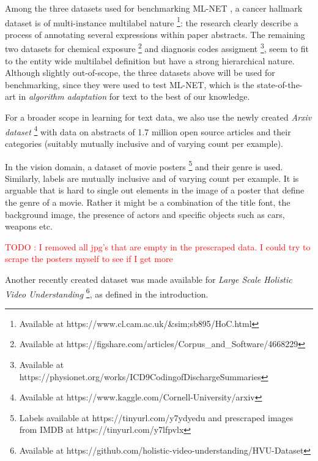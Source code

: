 \documentclass[sigconf,natbib,screen=true,review=true,anonymous]{acmart}
\newcommand\todo[1]{\textcolor{red}{TODO : #1}}
\begin{document}
Among the three datasets used for benchmarking ML-NET \cite{multitaskLabel}, a cancer hallmark dataset is of multi-instance multilabel nature \cite{cancerHallmarks} \footnote{Available at https://www.cl.cam.ac.uk/&sim;sb895/HoC.html}: the research clearly describe a process of annotating several expressions within paper abstracts. The remaining two datasets for chemical exposure \cite{chemExposure} \footnote{Available at https://figshare.com/articles/Corpus_and_Software/4668229} and diagnosis codes assigment \cite{diagnosisCode} \footnote{Available at https://physionet.org/works/ICD9CodingofDischargeSummaries}, seem to fit to the entity wide multilabel definition but have a strong hierarchical nature. Although slightly out-of-scope, the three datasets above will be used for benchmarking, since they were used to test ML-NET, which is the state-of-the-art in \emph{algorithm adaptation} for text to the best of our knowledge.

For a broader scope in learning for text data, we also use the newly created \emph{Arxiv dataset} \footnote{Available at https://www.kaggle.com/Cornell-University/arxiv} with data on abstracts of 1.7 million open source articles and their categories (suitably mutually inclusive and of varying count per example).

In the vision domain, a dataset of movie posters \footnote{Labels available at https://tinyurl.com/y7ydyedu and prescraped images from IMDB at https://tinyurl.com/y7lfpvlx} and their genre is used. Similarly, labels are mutually inclusive and of varying count per example. It is arguable that is hard to single out elements in the image of a poster that define the genre of a movie. Rather it might be a combination of the title font, the background image, the presence of actors and specific objects such as cars, weapons etc. 




\todo{I removed all jpg's that are empty in the prescraped data. I could try to scrape the posters myself to see if I get more}

Another recently created dataset was made available for \emph{Large Scale Holistic Video Understanding} \cite{holisticVideoData} \footnote{Available at https://github.com/holistic-video-understanding/HVU-Dataset}, as defined in the introduction.

\end{document}

